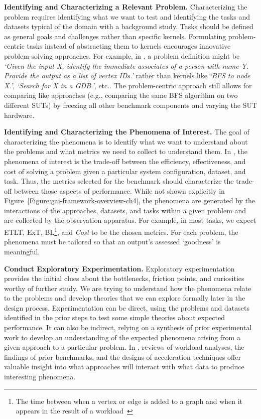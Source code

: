 \textbf{Identifying and Characterizing a Relevant Problem.}
Characterizing the problem requires identifying what we want to test and identifying the tasks and datasets typical of the domain with a background study. 
Tasks should be defined as general goals and challenges rather than specific kernels.
Formulating problem-centric tasks instead of abstracting them to kernels encourages innovative problem-solving approaches. 
For example, in \gai, a problem definition might be \textit{`Given the input X, identify the immediate associates of a person with name Y. Provide the output as a list of vertex IDs.'} rather than kernels like \textit{`BFS to node X.'}, \textit{`Search for X in a GDB.'}, etc..
The problem-centric approach still allows for comparing like approaches (e.g., comparing the same BFS algorithm on two different \ac{SUT}s) by freezing all other benchmark components and varying the \ac{SUT} hardware. 

\textbf{Identifying and Characterizing the Phenomena of Interest.}
The goal of characterizing the phenomena is to identify what we want to understand about the problems and what metrics we need to collect to understand them. 
In \gai, the phenomena of interest is the trade-off between the efficiency, effectiveness, and cost of solving a \gai problem given a particular system configuration, dataset, and task. 
Thus, the metrics selected for the benchmark should characterize the trade-off between those aspects of performance. 
While not shown explicitly in Figure~\ref{Figure:gai-framework-overview-ch4}, the phenomena are generated by the interactions of the approaches, datasets, and tasks within a given problem and are collected by the observation apparatus.
For example, in most \gai tasks, we expect \ac{ETLT}, \ac{ExT}, \ac{BL}\footnote{\textnormal{\scriptsize The time between when a vertex or edge is added to a graph and when it appears in the result of a workload~\cite{Basak2020}}}, and \textit{Cost} to be the chosen metrics.
For each problem, the phenomena must be tailored so that an output's assessed `goodness' is meaningful.

\textbf{Conduct Exploratory Experimentation.}
Exploratory experimentation provides the initial clues about the bottlenecks, friction points, and curiosities worthy of further study. 
We are trying to understand how the phenomena relate to the problems and develop theories that we can explore formally later in the design process. 
Experimentation can be direct, using the problems and datasets identified in the prior steps to test some simple theories about expected performance.
It can also be indirect, relying on a synthesis of prior experimental work to develop an understanding of the expected phenomena arising from a given approach to a particular problem.
In \gai, reviews of workload analyses, the findings of prior benchmarks, and the designs of acceleration techniques offer valuable insight into what approaches will interact with what data to produce interesting phenomena.

